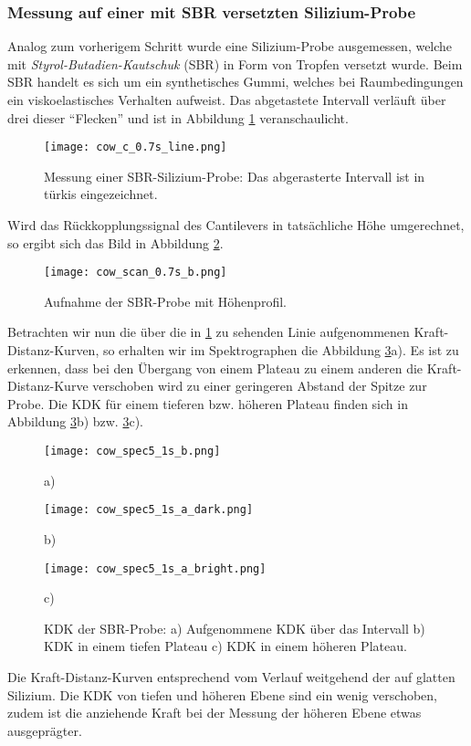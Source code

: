 \subsubsection{Messung auf einer mit SBR versetzten Silizium-Probe}
Analog zum vorherigem Schritt wurde eine Silizium-Probe ausgemessen, welche mit \emph{Styrol-Butadien-Kautschuk} (SBR) in Form von Tropfen versetzt wurde. Beim SBR handelt es sich um ein synthetisches Gummi, welches bei Raumbedingungen ein viskoelastisches Verhalten aufweist.
Das abgetastete Intervall verläuft über drei dieser ``Flecken'' und ist in Abbildung \ref{fig:cow_line} veranschaulicht.
\begin{figure}[h]
	\centering
	\texttt{[image: cow\_c\_0.7s\_line.png]}
	\caption{Messung einer SBR-Silizium-Probe: Das abgerasterte Intervall ist in türkis eingezeichnet.}
	\label{fig:cow_line}
\end{figure}
Wird das Rückkopplungssignal des Cantilevers in tatsächliche Höhe umgerechnet, so ergibt sich das Bild in Abbildung \ref{fig:cow_z}.
\begin{figure}[h]
	\centering
	\texttt{[image: cow\_scan\_0.7s\_b.png]}
	\caption{Aufnahme der SBR-Probe mit Höhenprofil.}
	\label{fig:cow_z}
\end{figure}
Betrachten wir nun die über die in \ref{fig:cow_line} zu sehenden Linie aufgenommenen Kraft-Distanz-Kurven, so erhalten wir im Spektrographen die Abbildung \ref{fig:cow_spec}a). Es ist zu erkennen, dass bei den Übergang von einem Plateau zu einem anderen die Kraft-Distanz-Kurve verschoben wird zu einer geringeren Abstand der Spitze zur Probe. Die KDK für einem tieferen bzw. höheren Plateau finden sich in Abbildung \ref{fig:cow_spec}b) bzw. \ref{fig:cow_spec}c).
\begin{figure}[h]
	\begin{minipage}{0.3\textwidth}
		\texttt{[image: cow\_spec5\_1s\_b.png]}
		\caption{a)}	
	\end{minipage}
	\hfill
		\begin{minipage}{0.3\textwidth}
		\texttt{[image: cow\_spec5\_1s\_a\_dark.png]}
		\caption{b)}	
	\end{minipage}
	\begin{minipage}{0.3\textwidth}
		\texttt{[image: cow\_spec5\_1s\_a\_bright.png]}
		\caption{c)}	
	\end{minipage}
	\caption{KDK der SBR-Probe: a) Aufgenommene KDK über das Intervall b) KDK in einem tiefen Plateau c) KDK in einem höheren Plateau.}
	\label{fig:cow_spec}
\end{figure}
Die Kraft-Distanz-Kurven entsprechend vom Verlauf weitgehend der auf glatten Silizium. Die KDK von tiefen und höheren Ebene sind ein wenig verschoben, zudem ist die anziehende Kraft bei der Messung der höheren Ebene etwas ausgeprägter.
